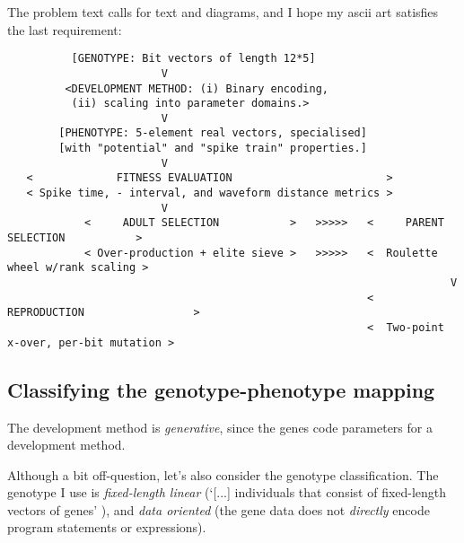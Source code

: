 \documentclass[a4paper,9pt]{article}
\newcommand{\tightit}{\vspace{-5pt}}
\newenvironment{tightquote}
{ \vspace{-2pt} \begin{quote} }
{ \end{quote} \vspace{-2pt} }
\begin{document}
The problem text calls for text and diagrams, and I hope my ascii art
satisfies the last requirement: 
{\scriptsize
\begin{verbatim}
          [GENOTYPE: Bit vectors of length 12*5]
                        V
         <DEVELOPMENT METHOD: (i) Binary encoding,          
          (ii) scaling into parameter domains.>             
                        V
        [PHENOTYPE: 5-element real vectors, specialised]
        [with "potential" and "spike train" properties.]
                        V
   <             FITNESS EVALUATION                        >
   < Spike time, - interval, and waveform distance metrics >
                        V
            <     ADULT SELECTION           >   >>>>>   <     PARENT SELECTION           >
            < Over-production + elite sieve >   >>>>>   <  Roulette wheel w/rank scaling >
                                                                     V
                                                        <        REPRODUCTION                 >
                                                        <  Two-point x-over, per-bit mutation >
\end{verbatim}
}

\subsection{Classifying the genotype-phenotype mapping}
\tightit \label{sec:mapping}
The development method is \emph{generative}, since the genes code parameters
for a development method.  

Although a bit off-question, let's also consider the
genotype classification.  The genotype I use is \emph{fixed-length linear}
(`[...] individuals that consist of fixed-length vectors of genes'
\cite{dejong}), and \emph{data oriented} (the gene data does not
\emph{directly} encode program statements or expressions). 
\end{document}
